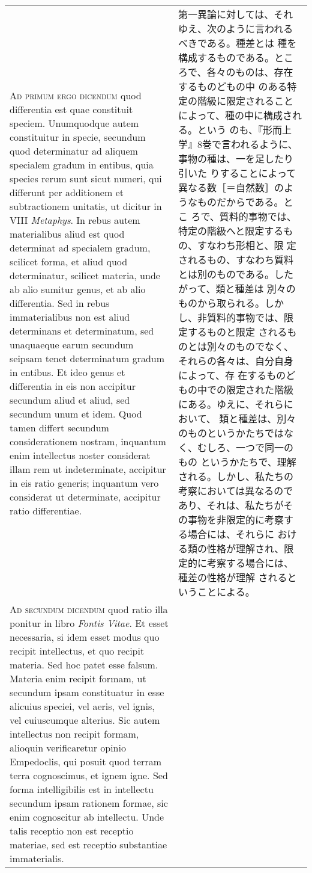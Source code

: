 \documentclass[10pt]{jsarticle} %
\begin{document}
\begin{longtable}{p{21em}p{21em}}
\\


{\scshape Ad primum ergo dicendum} quod differentia est
quae constituit speciem. Unumquodque autem constituitur in specie,
secundum quod determinatur ad aliquem specialem gradum in entibus, quia
species rerum sunt sicut numeri, qui differunt per additionem et
subtractionem unitatis, ut dicitur in VIII {\itshape Metaphys}. In rebus autem
materialibus aliud est quod determinat ad specialem gradum, scilicet
forma, et aliud quod determinatur, scilicet materia, unde ab alio
sumitur genus, et ab alio differentia. Sed in rebus immaterialibus non
est aliud determinans et determinatum, sed unaquaeque earum secundum
seipsam tenet determinatum gradum in entibus. Et ideo genus et
differentia in eis non accipitur secundum aliud et aliud, sed secundum
unum et idem. Quod tamen differt secundum considerationem nostram,
inquantum enim intellectus noster considerat illam rem ut indeterminate,
accipitur in eis ratio generis; inquantum vero considerat ut
determinate, accipitur ratio differentiae.


&

 第一異論に対しては、それゆえ、次のように言われるべきである。種差とは
 種を構成するものである。ところで、各々のものは、存在するものどもの中
 のある特定の階級に限定されることによって、種の中に構成される。という
 のも、『形而上学』8巻で言われるように、事物の種は、一を足したり引いた
 りすることによって異なる数［＝自然数］のようなものだからである。とこ
 ろで、質料的事物では、特定の階級へと限定するもの、すなわち形相と、限
 定されるもの、すなわち質料とは別のものである。したがって、類と種差は
 別々のものから取られる。しかし、非質料的事物では、限定するものと限定
 されるものとは別々のものでなく、それらの各々は、自分自身によって、存
 在するものどもの中での限定された階級にある。ゆえに、それらにおいて、
 類と種差は、別々のものというかたちではなく、むしろ、一つで同一のもの
 というかたちで、理解される。しかし、私たちの考察においては異なるので
 あり、それは、私たちがその事物を非限定的に考察する場合には、それらに
 おける類の性格が理解され、限定的に考察する場合には、種差の性格が理解
 されるということによる。



\\


{\scshape Ad secundum dicendum} quod ratio illa ponitur
in libro {\itshape Fontis Vitae}. Et esset necessaria, si idem esset modus quo
recipit intellectus, et quo recipit materia. Sed hoc patet esse
falsum. Materia enim recipit formam, ut secundum ipsam constituatur in
esse alicuius speciei, vel aeris, vel ignis, vel cuiuscumque
alterius. Sic autem intellectus non recipit formam, alioquin
verificaretur opinio Empedoclis, qui posuit quod terram terra
cognoscimus, et ignem igne. Sed forma intelligibilis est in intellectu
secundum ipsam rationem formae, sic enim cognoscitur ab intellectu. Unde
talis receptio non est receptio materiae, sed est receptio substantiae
immaterialis.



\end{longtable}
\end{document}

